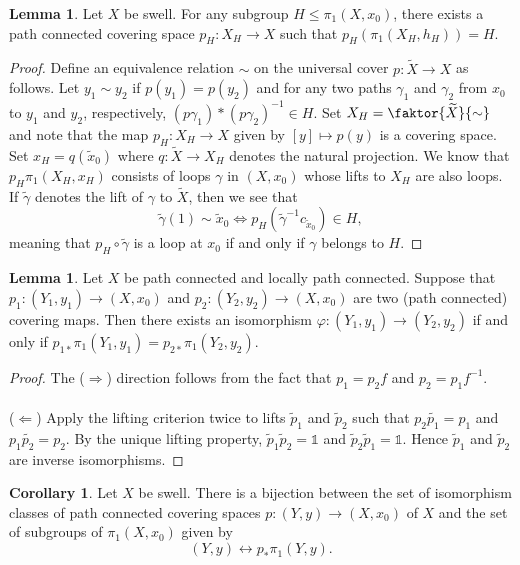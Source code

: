 \documentclass[10pt,letterpaper,cm]{nupset}
\theoremstyle{definition}
\theoremstyle{theorem}
\newtheorem{lemma}[definition]{Lemma}
\newtheorem{corollary}[definition]{Corollary}
\theoremstyle{remark}
\newcommand{\1}{\mathbb{1}}
\newcommand{\0}{\vec 0}
\begin{document}
\begin{lemma}
Let $X$ be swell. For any subgroup $H \leq \pi_1(X, x_0)$, there exists a path connected covering space $p_H : X_H \to X$ such that $p_H (\pi_1(X_H, h_H)) = H$.
\end{lemma}
\begin{proof}
Define an equivalence relation $\sim$ on the universal cover $p: \widetilde{X} \to X$ as follows. Let $y_1 \sim y_2$ if $p(y_1) = p(y_2)$ and for any two paths $\gamma_1$ and $\gamma_2$ from $x_0$ to $y_1$ and $y_2$, respectively, $(p\gamma_1)\ast (p\gamma_2)^{-1}\in H$. Set $X_H = \faktor{\widetilde{X}}{\sim}$ and note that the map $p_H : X_H \to X$ given by $[y] \mapsto p(y)$ is a covering space. Set $x_H= q(\tilde{x}_0)$ where $q: \widetilde{X} \to X_H$ denotes the natural projection. We know that $p_H \pi_1(X_H, x_H)$ consists of loops $\gamma$ in $(X, x_0)$ whose lifts to $X_H$ are also loops.  If $\tilde{\gamma}$ denotes the lift of $\gamma$ to $\widetilde{X}$, then we see that $$\tilde{\gamma}(1) \sim \tilde{x}_0 \iff p_H(\tilde{\gamma}^{-1} c_{\tilde{x} _0}) \in H,$$ meaning that  $p_H \circ \tilde{\gamma}$ is a loop at $x_0$ if and only if $\gamma$ belongs to $H$.
\end{proof}

\begin{lemma}
Let $X$ be path connected and locally path connected. Suppose that $p_1:(Y_1, y_1) \to (X, x_0)$ and $p_2 : (Y_2, y_2) \to (X, x_0)$ are two (path connected) covering maps. Then there exists an isomorphism $\varphi : (Y_1, y_1) \to (Y_2, y_2)$ if and only if  $p_{1\ast} \pi_1(Y_1, y_1) = p_{2 \ast} \pi_1(Y_2, y_2)$.
\end{lemma}
\begin{proof}
The ($\Longrightarrow$) direction follows from the fact that $p_1 = p_2f$ and $p_2 = p_1f^{-1}$. 
\\ \\ ($\Longleftarrow$) Apply the lifting criterion twice to lifts $\tilde{p}_1$ and $\tilde{p}_2$ such that $p_2\tilde{p_1} = p_1$ and $p_1\tilde{p_2}=p_2$. By the unique lifting property, $\tilde{p}_1\tilde{p}_2=\1$ and $\tilde{p}_2\tilde{p}_1 = \1$. Hence $\tilde{p}_1$ and $\tilde{p}_2$ are inverse isomorphisms. 
\end{proof}

\begin{corollary}
Let $X$ be swell. There is a bijection between the set of isomorphism classes of path connected covering spaces $p: (Y, y) \to (X, x_0)$ of $X$ and the set of subgroups of $\pi_1(X, x_0)$ given by $$(Y, y) \longleftrightarrow p_{\ast}\pi_1(Y, y)    .$$
\end{corollary}
\end{document}
